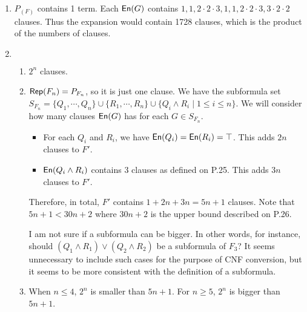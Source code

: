 \begin{exer}[1.7]
    $ $
    \begin{enumerate}[label=(\alph*)]
        \item
            $P_{(F)}$ contains 1 term.
            Each $\operatorname{\textsf{En}}(G)$ contains $1, 1, 2 \cdot 2 \cdot 3, 1, 1, 2 \cdot 2 \cdot 3, 3 \cdot 2 \cdot 2$ clauses.
            Thus the expansion would contain 1728 clauses, which is the product of the numbers of clauses.
        \item
            $ $
            \begin{enumerate}[label=(\roman*)]
                \item
                    $2^n$ clauses.
                \item
                    $\operatorname{\textsf{Rep}}(F_n) = P_{F_n}$, so it is just one clause.
                    We have the subformula set $S_{F_n} = \{ Q_1, \cdots, Q_n \} \cup \{ R_1, \cdots, R_n \} \cup \{ Q_i \land R_i \mid 1 \leq i \leq n \}$.
                    We will consider how many clauses $\operatorname{\textsf{En}}(G)$ has for each $G \in S_{F_n}$.
                    \begin{itemize}
                        \item
                            For each $Q_i$ and $R_i$, we have $\operatorname{\textsf{En}}(Q_i) = \operatorname{\textsf{En}}(R_i) = \top$.
                            This adds $2n$ clauses to $F'$.
                        \item
                            $\operatorname{\textsf{En}}(Q_i \land R_i)$ contains 3 clauses as defined on P.25.
                            This adds $3n$ clauses to $F'$.
                    \end{itemize}
                    Therefore, in total, $F'$ contains $1 + 2n + 3n = 5n + 1$ clauses.
                    Note that $5n + 1 < 30n + 2$ where $30n + 2$ is the upper bound described on P.26.

                    I am not sure if a subformula can be bigger.
                    In other words, for instance, should $(Q_1 \land R_1) \lor (Q_2 \land R_2)$ be a subformula of $F_3$?
                    It seems unnecessary to include such cases for the purpose of CNF conversion, but it seems to be more consistent with the definition of a subformula.
                \item
                    When $n \leq 4$, $2^n$ is smaller than $5n + 1$.
                    For $n \geq 5$, $2^n$ is bigger than $5n + 1$.
            \end{enumerate}
    \end{enumerate}
\end{exer}

